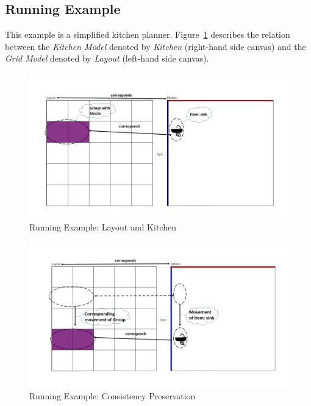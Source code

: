 \subsection{Running Example}\label{subsec:runningexample}
This example is a simplified kitchen planner. Figure~\ref{fig:Running_Example_GUI} describes the relation between the \textit{Kitchen Model} denoted by \textit{Kitchen} (right-hand side canvas) and the \textit{Grid Model} denoted by \textit{Layout} (left-hand side canvas). 

\begin{figure}[h]
	\centering
	\includegraphics[width=1\textwidth]{figures/KitchenToGrid}
	\caption{Running Example: Layout and Kitchen}
	\label{fig:Running_Example_GUI}
\end{figure} 

\begin{figure}[h]
	\centering
	\includegraphics[width=1\textwidth]{figures/KitchenToGrid_consistency}
	\caption{Running Example: Consistency Preservation}
	\label{fig:Running_Example_GUI_consistency}
\end{figure}


